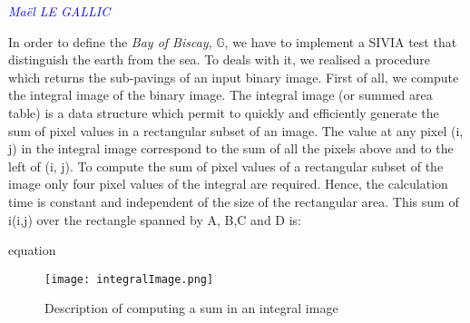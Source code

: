 \vspace{0.5 cm}
\textcolor{blue} {\textit{Maël LE GALLIC}}
\vspace{0.3 cm}

In order to define the \emph{Bay of Biscay}, $\mathbb{G}$, we have to implement a SIVIA test that distinguish the earth from the sea. To deals with it, we realised a procedure which returns the sub-pavings of an input binary image. 
First of all, we compute the integral image of the binary image. The integral image (or summed area table) is a data structure which permit to quickly and efficiently generate the sum of pixel values in a rectangular subset of an image. The value at any pixel (i, j) in the integral image correspond to the sum of all the pixels above and to the left of (i, j). To compute the sum of pixel values of a rectangular subset of the image only four pixel values of the integral are required. Hence, the calculation time is constant and independent of the size of the rectangular area. This sum of i(i,j) over the rectangle spanned by A, B,C and D is:

equation

\begin{figure}[!h] 
\center
\texttt{[image: integralImage.png]} 
\caption{Description of computing a sum in an integral image } 
\label{fig: Integral image}
\end{figure}


